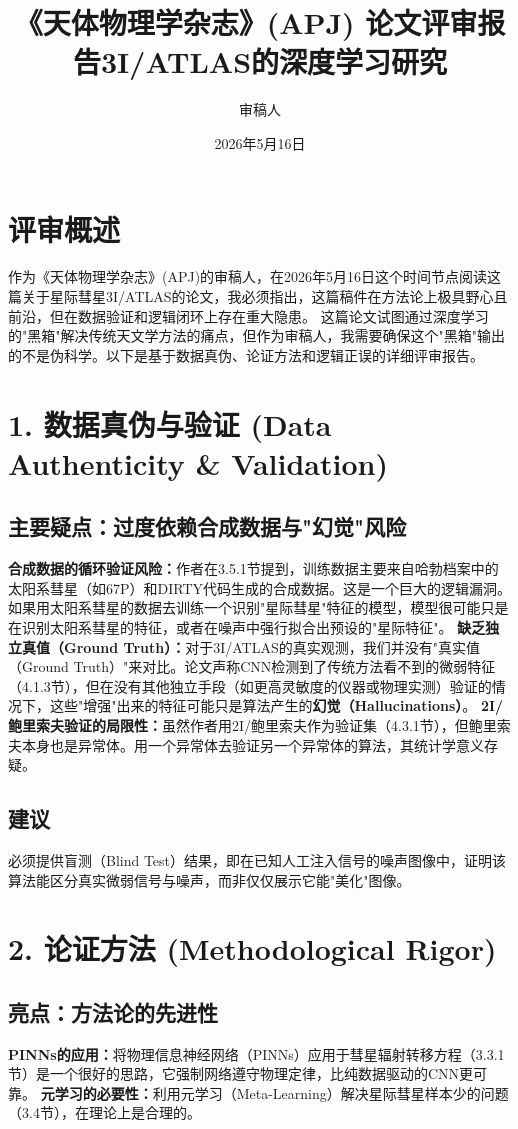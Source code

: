 \documentclass[12pt]{article}
\title{《天体物理学杂志》(APJ) 论文评审报告\关于星际彗星3I/ATLAS的深度学习研究}
\author{审稿人}
\date{2026年5月16日}
\begin{document}
\maketitle
\section{评审概述}
作为《天体物理学杂志》(APJ)的审稿人，在2026年5月16日这个时间节点阅读这篇关于星际彗星3I/ATLAS的论文，我必须指出，这篇稿件在方法论上极具野心且前沿，但在数据验证和逻辑闭环上存在重大隐患。
这篇论文试图通过深度学习的"黑箱"解决传统天文学方法的痛点，但作为审稿人，我需要确保这个"黑箱"输出的不是伪科学。以下是基于数据真伪、论证方法和逻辑正误的详细评审报告。
\section{1. 数据真伪与验证 (Data Authenticity & Validation)}
\subsection{主要疑点：过度依赖合成数据与"幻觉"风险}
\textbf{合成数据的循环验证风险：}作者在3.5.1节提到，训练数据主要来自哈勃档案中的太阳系彗星（如67P）和DIRTY代码生成的合成数据。这是一个巨大的逻辑漏洞。如果用太阳系彗星的数据去训练一个识别"星际彗星"特征的模型，模型很可能只是在识别太阳系彗星的特征，或者在噪声中强行拟合出预设的"星际特征"。
\textbf{缺乏独立真值（Ground Truth）：}对于3I/ATLAS的真实观测，我们并没有"真实值（Ground Truth）"来对比。论文声称CNN检测到了传统方法看不到的微弱特征（4.1.3节），但在没有其他独立手段（如更高灵敏度的仪器或物理实测）验证的情况下，这些"增强"出来的特征可能只是算法产生的\textbf{幻觉（Hallucinations）}。
\textbf{2I/鲍里索夫验证的局限性：}虽然作者用2I/鲍里索夫作为验证集（4.3.1节），但鲍里索夫本身也是异常体。用一个异常体去验证另一个异常体的算法，其统计学意义存疑。
\subsection{建议}
必须提供盲测（Blind Test）结果，即在已知人工注入信号的噪声图像中，证明该算法能区分真实微弱信号与噪声，而非仅仅展示它能"美化"图像。
\section{2. 论证方法 (Methodological Rigor)}
\subsection{亮点：方法论的先进性}
\textbf{PINNs的应用：}将物理信息神经网络（PINNs）应用于彗星辐射转移方程（3.3.1节）是一个很好的思路，它强制网络遵守物理定律，比纯数据驱动的CNN更可靠。
\textbf{元学习的必要性：}利用元学习（Meta-Learning）解决星际彗星样本少的问题（3.4节），在理论上是合理的。
\end{document}
